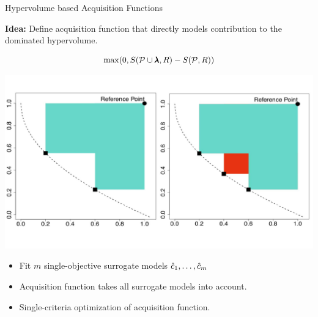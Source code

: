 \begin{frame}{Hypervolume based Acquisition Functions}

    \textbf{Idea:} Define acquisition function that directly models contribution to the dominated hypervolume.

            $$
            \max(0, S(\mathcal{P} \cup \pmb{\lambda}, R) - S(\mathcal{P}, R))
            $$
    \begin{center}
        \includegraphics[scale=0.22]{images/hv_contribution}
    \end{center}

    \begin{itemize}
            \item Fit $m$ single-objective surrogate models $\hat{c}_1, \dots, \hat{c}_m$
            \item Acquisition function takes all surrogate models into account.
            \item Single-criteria optimization of acquisition function.
    \end{itemize}

\end{frame}

